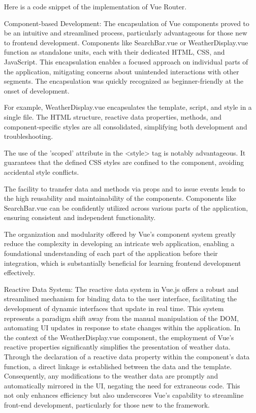 Here is a code snippet of the implementation of Vue Router.

Component-based Development: 
The encapsulation of Vue components proved to be an intuitive and streamlined process, particularly advantageous for those new to frontend development. Components like SearchBar.vue or WeatherDisplay.vue function as standalone units, each with their dedicated HTML, CSS, and JavaScript. This encapsulation enables a focused approach on individual parts of the application, mitigating concerns about unintended interactions with other segments. The encapsulation was quickly recognized as beginner-friendly at the onset of development.

For example, WeatherDisplay.vue encapsulates the template, script, and style in a single file. The HTML structure, reactive data properties, methods, and component-specific styles are all consolidated, simplifying both development and troubleshooting.

The use of the 'scoped' attribute in the <style> tag is notably advantageous. It guarantees that the defined CSS styles are confined to the component, avoiding accidental style conflicts.

The facility to transfer data and methods via props and to issue events lends to the high reusability and maintainability of the components. Components like SearchBar.vue can be confidently utilized across various parts of the application, ensuring consistent and independent functionality.

The organization and modularity offered by Vue’s component system greatly reduce the complexity in developing an intricate web application, enabling a foundational understanding of each part of the application before their integration, which is substantially beneficial for learning frontend development effectively.

Reactive Data System:
The reactive data system in Vue.js offers a robust and streamlined mechanism for binding data to the user interface, facilitating the development of dynamic interfaces that update in real time. This system represents a paradigm shift away from the manual manipulation of the DOM, automating UI updates in response to state changes within the application.
In the context of the WeatherDisplay.vue component, the employment of Vue's reactive properties significantly simplifies the presentation of weather data. Through the declaration of a reactive data property within the component's data function, a direct linkage is established between the data and the template. Consequently, any modifications to the weather data are promptly and automatically mirrored in the UI, negating the need for extraneous code. This not only enhances efficiency but also underscores Vue's capability to streamline front-end development, particularly for those new to the framework.

